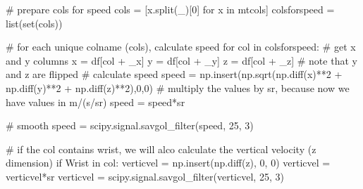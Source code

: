 \documentclass[
  letterpaper,
  DIV=11,
  numbers=noendperiod]{scrreprt}
\newenvironment{Shaded}{\begin{snugshade}}{\end{snugshade}}
\newcommand{\BuiltInTok}[1]{\textcolor[rgb]{0.00,0.23,0.31}{#1}}
\newcommand{\CommentTok}[1]{\textcolor[rgb]{0.37,0.37,0.37}{#1}}
\newcommand{\ControlFlowTok}[1]{\textcolor[rgb]{0.00,0.23,0.31}{#1}}
\newcommand{\DecValTok}[1]{\textcolor[rgb]{0.68,0.00,0.00}{#1}}
\newcommand{\KeywordTok}[1]{\textcolor[rgb]{0.00,0.23,0.31}{#1}}
\newcommand{\NormalTok}[1]{\textcolor[rgb]{0.00,0.23,0.31}{#1}}
\newcommand{\OperatorTok}[1]{\textcolor[rgb]{0.37,0.37,0.37}{#1}}
\newcommand{\StringTok}[1]{\textcolor[rgb]{0.13,0.47,0.30}{#1}}
\begin{document}
\begin{Shaded}
\begin{Highlighting}[]
        \CommentTok{\# prepare cols for speed}
\NormalTok{        cols }\OperatorTok{=}\NormalTok{ [x.split(}\StringTok{\textquotesingle{}\_\textquotesingle{}}\NormalTok{)[}\DecValTok{0}\NormalTok{] }\ControlFlowTok{for}\NormalTok{ x }\KeywordTok{in}\NormalTok{ mtcols]}
\NormalTok{        colsforspeed }\OperatorTok{=} \BuiltInTok{list}\NormalTok{(}\BuiltInTok{set}\NormalTok{(cols))}

        \CommentTok{\# for each unique colname (cols), calculate speed }
        \ControlFlowTok{for}\NormalTok{ col }\KeywordTok{in}\NormalTok{ colsforspeed:}
            \CommentTok{\# get x and y columns}
\NormalTok{            x }\OperatorTok{=}\NormalTok{ df[col }\OperatorTok{+} \StringTok{\textquotesingle{}\_x\textquotesingle{}}\NormalTok{]}
\NormalTok{            y }\OperatorTok{=}\NormalTok{ df[col }\OperatorTok{+} \StringTok{\textquotesingle{}\_y\textquotesingle{}}\NormalTok{]}
\NormalTok{            z }\OperatorTok{=}\NormalTok{ df[col }\OperatorTok{+} \StringTok{\textquotesingle{}\_z\textquotesingle{}}\NormalTok{] }\CommentTok{\# note that y and z are flipped}
            \CommentTok{\# calculate speed}
\NormalTok{            speed }\OperatorTok{=}\NormalTok{ np.insert(np.sqrt(np.diff(x)}\OperatorTok{**}\DecValTok{2} \OperatorTok{+}\NormalTok{ np.diff(y)}\OperatorTok{**}\DecValTok{2} \OperatorTok{+}\NormalTok{ np.diff(z)}\OperatorTok{**}\DecValTok{2}\NormalTok{),}\DecValTok{0}\NormalTok{,}\DecValTok{0}\NormalTok{)}
            \CommentTok{\# multiply the values by sr, because now we have values in m/(s/sr)}
\NormalTok{            speed }\OperatorTok{=}\NormalTok{ speed}\OperatorTok{*}\NormalTok{sr}

            \CommentTok{\# smooth}
\NormalTok{            speed }\OperatorTok{=}\NormalTok{ scipy.signal.savgol\_filter(speed, }\DecValTok{25}\NormalTok{, }\DecValTok{3}\NormalTok{)}

            \CommentTok{\# if the col contains wrist, we will alco calculate the vertical velocity (z dimension)}
            \ControlFlowTok{if} \StringTok{\textquotesingle{}Wrist\textquotesingle{}} \KeywordTok{in}\NormalTok{ col:}
\NormalTok{                verticvel }\OperatorTok{=}\NormalTok{ np.insert(np.diff(z), }\DecValTok{0}\NormalTok{, }\DecValTok{0}\NormalTok{)}
\NormalTok{                verticvel }\OperatorTok{=}\NormalTok{ verticvel}\OperatorTok{*}\NormalTok{sr}
\NormalTok{                verticvel }\OperatorTok{=}\NormalTok{ scipy.signal.savgol\_filter(verticvel, }\DecValTok{25}\NormalTok{, }\DecValTok{3}\NormalTok{)}


\end{Highlighting}
\end{Shaded}
\end{document}
